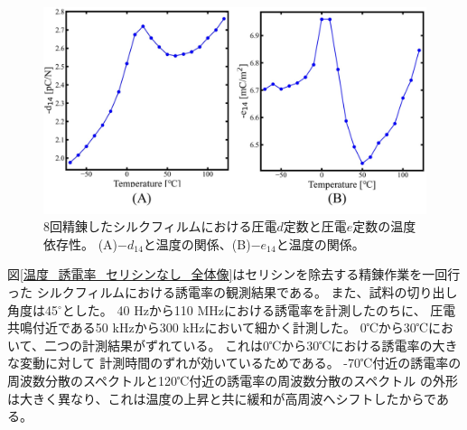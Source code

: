\documentclass[dvipdfmx,12pt,a4paper]{jreport}
\begin{document}
			\begin{figure}[h]
				\centering
				\includegraphics[width=\linewidth]{8回_d定数_e定数_温度依存性.jpg}
				\caption{8回精錬したシルクフィルムにおける圧電$d$定数と圧電$e$定数の温度依存性。
				(A)$-d_{14}$と温度の関係、(B)$-e_{14}$と温度の関係。}
				\label{8回_d定数_e定数_温度依存性}
			\end{figure}
			\newpage
			図\ref{温度_誘電率_セリシンなし_全体像}はセリシンを除去する精錬作業を一回行った
			シルクフィルムにおける誘電率の観測結果である。
			また、試料の切り出し角度は45$^{\circ}$とした。
			40 Hzから110 MHzにおける誘電率を計測したのちに、
			圧電共鳴付近である50 kHzから300 kHzにおいて細かく計測した。
			0℃から30℃において、二つの計測結果がずれている。
			これは0℃から30℃における誘電率の大きな変動に対して
			計測時間のずれが効いているためである。
			-70℃付近の誘電率の周波数分散のスペクトルと120℃付近の誘電率の周波数分散のスペクトル
			の外形は大きく異なり、これは温度の上昇と共に緩和が高周波へシフトしたからである。
\end{document}
